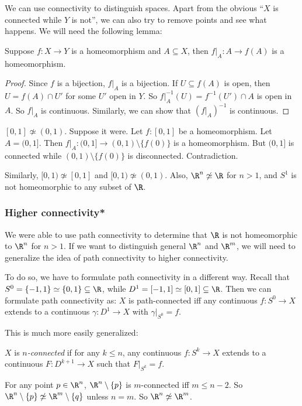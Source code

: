 \documentclass[a4paper]{article}
\begin{document}
We can use connectivity to distinguish spaces. Apart from the obvious ``$X$ is connected while $Y$ is not'', we can also try to remove points and see what happens. We will need the following lemma:
\begin{lemma}
  Suppose $f: X\to Y$ is a homeomorphism and $A\subseteq X$, then $f|_A: A\to f(A)$ is a homeomorphism.
\end{lemma}

\begin{proof}
  Since $f$ is a bijection, $f|_A$ is a bijection. If $U\subseteq f(A)$ is open, then $U = f(A) \cap U'$ for some $U'$ open in $Y$. So $f|_A^{-1}(U) = f^{-1}(U')\cap A$ is open in $A$. So $f|_A$ is continuous. Similarly, we can show that $(f|_A)^{-1}$ is continuous.
\end{proof}

\begin{eg} $[0, 1] \not\simeq (0, 1)$. Suppose it were. Let $f: [0, 1]$ be a homeomorphism. Let $A = (0, 1]$. Then $f|_A: (0, 1] \to (0, 1)\setminus\{f(0)\}$ is a homeomorphism. But $(0, 1]$ is connected while $(0, 1)\setminus \{f(0)\}$ is disconnected. Contradiction.

Similarly, $[0, 1)\not\simeq [0, 1]$ and $[0, 1)\not\simeq (0, 1)$. Also, $\R^n\not \simeq \R$ for $n > 1$, and $S^1$ is not homeomorphic to any subset of $\R$.
\end{eg}

\subsubsection{Higher connectivity*}
We were able to use path connectivity to determine that $\R$ is not homeomorphic to $\R^n$ for $n > 1$. If we want to distinguish general $\R^n$ and $\R^m$, we will need to generalize the idea of path connectivity to higher connectivity.

To do so, we have to formulate path connectivity in a different way. Recall that $S^0 = \{-1, 1\} \simeq \{0, 1\}\subseteq \R$, while $D^1 = [-1, 1] \simeq [0, 1] \subseteq \R$. Then we can formulate path connectivity as: $X$ is path-connected iff any continuous $f: S^0\to X$ extends to a continuous $\gamma: D^1 \to X$ with $\gamma|_{S^0} = f$.

This is much more easily generalized:
\begin{defi}[$n$-connectedness]
  $X$ is $n$\emph{-connected} if for any $k \leq n$, any continuous $f: S^k \to X$ extends to a continuous $F: D^{k + 1}\to X$ such that $F|_{S^k} = f$.
\end{defi}
For any point $p\in \R^n$, $\R^n \setminus \{p\}$ is $m$-connected iff $m \leq n - 2$. So $\R^n\setminus\{p\} \not\simeq \R^m\setminus\{q\}$ unless $n = m$. So $\R^n \not\simeq \R^m$.
\end{document}

